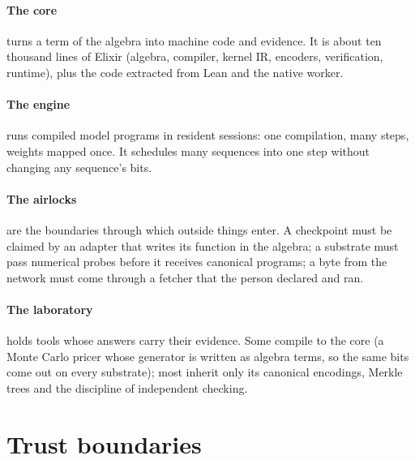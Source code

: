 \paragraph{The core} turns a term of the algebra into machine code and evidence. It is about ten
thousand lines of Elixir (algebra, compiler, kernel IR, encoders, verification, runtime), plus the
code extracted from Lean and the native worker.

\paragraph{The engine} runs compiled model programs in resident sessions: one compilation, many steps,
weights mapped once. It schedules many sequences into one step without changing any sequence's bits.

\paragraph{The airlocks} are the boundaries through which outside things enter. A checkpoint must be
claimed by an adapter that writes its function in the algebra; a substrate must pass numerical probes
before it receives canonical programs; a byte from the network must come through a fetcher that the
person declared and ran.

\paragraph{The laboratory} holds tools whose answers carry their evidence. Some compile to the core
(a Monte Carlo pricer whose generator is written as algebra terms, so the same bits come out on every
substrate); most inherit only its canonical encodings, Merkle trees and the discipline of independent
checking.

\section{Trust boundaries}

